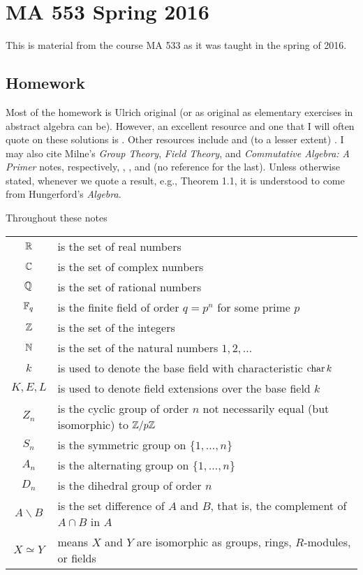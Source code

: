 \section{MA 553 Spring 2016}
This is material from the course MA 533 as it was taught in the spring of
2016.%
\bigskip
\subsection{Homework}
Most of the homework is Ulrich original (or as original as elementary
exercises in abstract algebra can be). However, an excellent resource and
one that I will often quote on these solutions is \cite{hungerford}. Other
resources include \cite{dummit-foote} and (to a lesser extent)
\cite{herstein}. I may also cite Milne's \emph{Group Theory}, \emph{Field
  Theory}, and \emph{Commutative Algebra: A Primer} notes, respectively,
\cite{milneGT}, \cite{milneFT}, and (no reference for the last). Unless
otherwise stated, whenever we quote a result, e.g., Theorem 1.1, it is
understood to come from Hungerford's \emph{Algebra}.

Throughout these notes

\begin{tabular}{cl}
  $\mathbb{R}$   & is the set of real numbers\\
  $\mathbb{C}$   & is the set of complex numbers\\
  $\mathbb{Q}$   & is the set of rational numbers\\
  $\mathbb{F}_q$ & is the finite field of order $q=p^n$ for some prime $p$\\
  $\mathbb{Z}$   & is the set of the integers\\
  $\mathbb{N}$   & is the set of the natural numbers $1,2,\dotsc$\\
  $k$   & is used to denote the base field with
             characteristic $\operatorname{char} k$\\
  $K,E,L$& is used to denote field extensions over the base field
                    $k$\\
  $Z_n$    & is the cyclic group of order $n$ not necessarily equal
             (but isomorphic) to $\mathbb{Z}/p\mathbb{Z}$\\
  $S_n$    & is the symmetric group on $\{1,\dotsc,n\}$\\
  $A_n$    & is the alternating group on $\{1,\dotsc,n\}$\\
  $D_n$    & is the dihedral group of order $n$\\
  $A\smallsetminus B$ & is the set difference of $A$ and $B$, that is, the
                        complement of $A\cap B$ in $A$\\
  $X\simeq Y$ & means $X$ and $Y$ are isomorphic as groups, rings,
                $R$-modules, or fields
\end{tabular}

